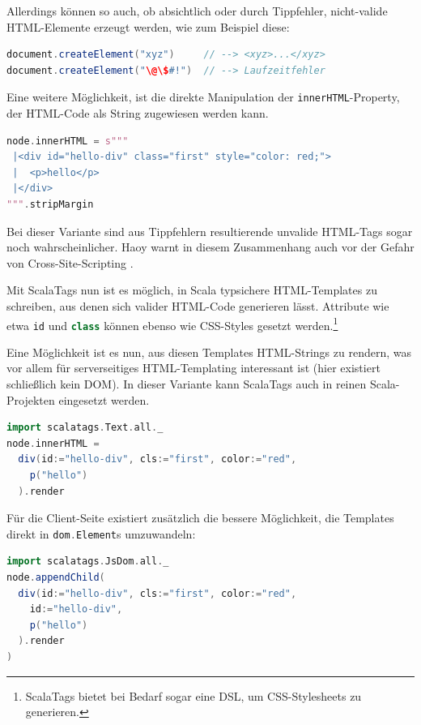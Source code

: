 \documentclass[a4paper, 12pt, hidelinks, listof=totoc, listoftables=totoc, bibliography=totoc]{scrreprt}
\newcommand{\code}[1]{\lstinline[language=Scala, style=inline]|#1|}
\newcommand{\scala}[1]{\lstinline[language=Scala, style=inline]|#1|}
\begin{document}
Allerdings können so auch, ob absichtlich oder durch Tippfehler, nicht-valide \ac{HTML}-Elemente erzeugt werden, wie zum Beispiel diese:
\begin{lstlisting}[language=Scala, style=snippet]
document.createElement("xyz")     // --> <xyz>...</xyz>
document.createElement("\@\$#!")  // --> Laufzeitfehler
\end{lstlisting}

Eine weitere Möglichkeit, ist die direkte Manipulation der \code{innerHTML}-Property, der \ac{HTML}-Code als String zugewiesen werden kann.

\begin{lstlisting}[language=Scala, caption={HTML-Generierung mit Scala-js-dom und Strings.}]
node.innerHTML = s"""
 |<div id="hello-div" class="first" style="color: red;">
 |  <p>hello</p>
 |</div>
""".stripMargin
\end{lstlisting}

Bei dieser Variante sind aus Tippfehlern resultierende unvalide \ac{HTML}-Tags sogar noch wahrscheinlicher. Haoy warnt in diesem Zusammenhang auch vor der Gefahr von Cross-Site-Scripting \cite[\#HelloWorld:HTML]{haoyi.HOS}.

Mit ScalaTags nun ist es möglich, in Scala typsichere \ac{HTML}-Templates zu schreiben, aus denen sich valider \ac{HTML}-Code generieren lässt. Attribute wie etwa \code{id} und \code{class} können ebenso wie \ac{CSS}-Styles gesetzt werden.\footnote{ScalaTags bietet bei Bedarf sogar eine \ac{DSL}, um \ac{CSS}-Stylesheets zu generieren.}

Eine Möglichkeit ist es nun, aus diesen Templates \ac{HTML}-Strings zu rendern, was vor allem für serverseitiges \ac{HTML}-Templating interessant ist (hier existiert schließlich kein \ac{DOM}). In dieser Variante kann ScalaTags auch in reinen Scala-Projekten eingesetzt werden.

\begin{lstlisting}[language=Scala, caption={HTML-Generierung mit ScalaTags und Strings.}]
import scalatags.Text.all._
node.innerHTML =
  div(id:="hello-div", cls:="first", color:="red",
    p("hello")
  ).render
\end{lstlisting}

Für die Client-Seite existiert zusätzlich die bessere Möglichkeit, die Templates direkt in \scala{dom.Element}s umzuwandeln:

\begin{lstlisting}[language=Scala, caption={HTML-Generierung mit ScalaTags und Nodes.}]
import scalatags.JsDom.all._
node.appendChild(
  div(id:="hello-div", cls:="first", color:="red",
    id:="hello-div",
    p("hello")
  ).render
)
\end{lstlisting}
\end{document}
